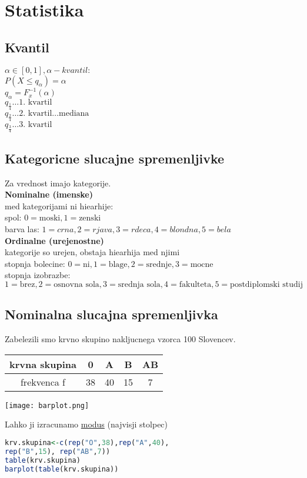 \section{Statistika}

\subsection{Kvantil}
$\alpha\in [0,1], \alpha - kvantil:$\\
$P(X\leq q_\alpha)=\alpha$\\
$q_\alpha = F_x^{-1}(\alpha)$\\
$q_{\frac{1}{4}}\dots\text{1. kvartil}$\\
$q_{\frac{2}{4}}\dots\text{2. kvartil}\dots \text{mediana}$\\
$q_{\frac{3}{4}}\dots\text{3. kvartil}$\\

\subsection{Kategoricne slucajne spremenljivke}
Za vrednost imajo kategorije.\\
\textbf{Nominalne (imenske)}\\
med kategorijami ni hiearhije:\\
spol: $0=\text{moski}, 1=\text{zenski}$\\
barva las: $1=crna, 2=rjava, 3=rdeca, 4=blondna, 5=bela$\\
\textbf{Ordinalne (urejenostne)}\\
kategorije so urejen, obstaja hiearhija med njimi\\
stopnja bolecine: $0=\text{ni}, 1=\text{blage}, 2=\text{srednje}, 3=\text{mocne}$\\
stopnja izobrazbe: $1=\text{brez}, 2=\text{osnovna sola}, 3=\text{srednja sola}, 4=\text{fakulteta},5=\text{postdiplomski studij}$


\subsection{Nominalna slucajna spremenljivka}
Zabelezili smo krvno skupino nakljucnega vzorca 100 Slovencev.\\
\begin{tabular}{|c | c | c | c | c |}
    \hline
    krvna skupina & 0 & A & B & AB\\
    \hline
    frekvenca f & 38 & 40 & 15 & 7\\
    \hline
\end{tabular}
\begin{center}
    \texttt{[image: barplot.png]}    
\end{center}
Lahko ji izracunamo \underline{modus} (najvisji stolpec)
\begin{lstlisting}[language=R]
krv.skupina<-c(rep("O",38),rep("A",40),
rep("B",15), rep("AB",7))
table(krv.skupina)
barplot(table(krv.skupina))
\end{lstlisting}


